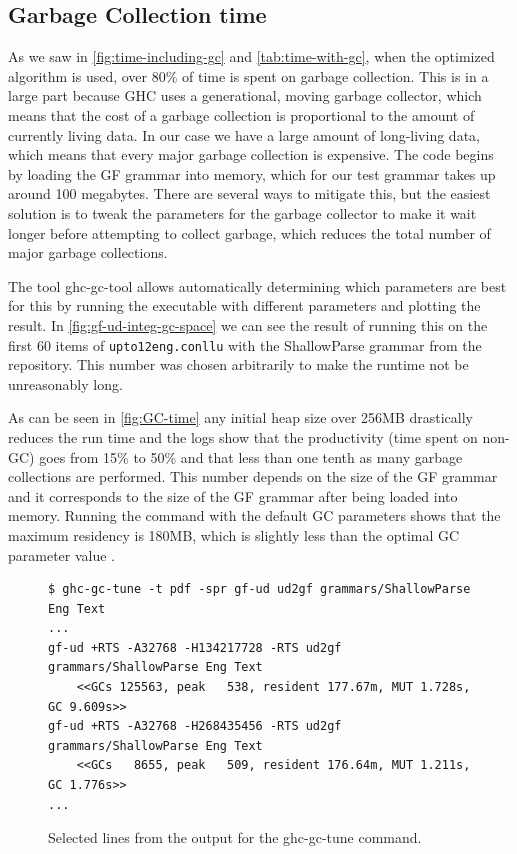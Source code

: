 \subsection{Garbage Collection time}\label{sect:gc-time}
As we saw in \autoref{fig:time-including-gc} and \autoref{tab:time-with-gc}, when the optimized algorithm is used, over 80\% of time is spent on garbage collection. This is in a large part because GHC uses a generational, moving garbage collector\cite{ungar1984generation}, which means that the cost of a garbage collection is proportional to the amount of currently living data. %
In our case we have a large amount of long-living data, which means that every major garbage collection is expensive. The code begins by loading the GF grammar into memory, which for our test grammar takes up around 100 megabytes. There are several ways to mitigate this, but the easiest solution is to tweak the parameters for the garbage collector to make it wait longer before attempting to collect garbage, which reduces the total number of major garbage collections.

The tool ghc-gc-tool allows automatically determining which parameters are best for this by running the executable with different parameters and plotting the result. In \autoref{fig:gf-ud-integ-gc-space} we can see the result of running this on the first 60 items of \texttt{upto12eng.conllu} with the ShallowParse grammar from the repository. This number was chosen arbitrarily to make the runtime not be unreasonably long.

As can be seen in \autoref{fig:GC-time} any initial heap size over 256MB drastically reduces the run time and the logs show that the productivity (time spent on non-GC) goes from 15\% to 50\% and that less than one tenth as many garbage collections are performed. This number depends on the size of the GF grammar and it corresponds to the size of the GF grammar after being loaded into memory. Running the command with the default GC parameters shows that the maximum residency is 180MB, which is slightly less than the optimal GC parameter value .


\begin{figure}
    \centering
\begin{verbatim}
$ ghc-gc-tune -t pdf -spr gf-ud ud2gf grammars/ShallowParse Eng Text
...
gf-ud +RTS -A32768 -H134217728 -RTS ud2gf grammars/ShallowParse Eng Text
    <<GCs 125563, peak   538, resident 177.67m, MUT 1.728s, GC 9.609s>>
gf-ud +RTS -A32768 -H268435456 -RTS ud2gf grammars/ShallowParse Eng Text
    <<GCs   8655, peak   509, resident 176.64m, MUT 1.211s, GC 1.776s>>
...
\end{verbatim}
    \caption{Selected lines from the output for the ghc-gc-tune command.}
    \label{fig:ghc-gc-tune-text-output}
\end{figure}

